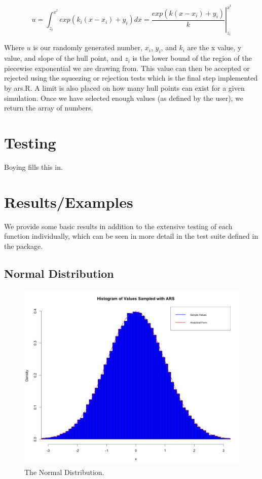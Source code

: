 \documentclass[12pt, oneside]{article}
\begin{document}
\[ u = \int_{z_i}^{x^t} exp(k_i (x - x_i) + y_i) dx = \left. \frac{exp(k (x - x_i )+ y_i)}{k} \right|_{z_i}^{x^t} \] 

Where \(u\) is our randomly generated number, \(x_i\), \(y_i\), and \(k_i\) are the x value, y value, and slope of the hull point, and \(z_i\) is the lower bound of the region of the piecewise exponential we are drawing from.  This value can then be accepted or rejected using the squeezing or rejection tests which is the final step implemented by ars.R.    A limit is also placed on how many hull points can exist for a given simulation.  Once we have selected enough values (as defined by the user), we return the array of numbers.

\section{Testing}

Boying fills this in.

\section{Results/Examples}

We provide some basic results in addition to the extensive testing of each function individually, which can be seen in more detail in the test suite defined in the package.

\subsection{Normal Distribution}

\begin{figure}[H]
\centering
  \includegraphics[scale=.25]{figure/normal.jpeg}
  \caption{The Normal Distribution.}
  \label{fig:d1}
\end{figure}
\end{document}
